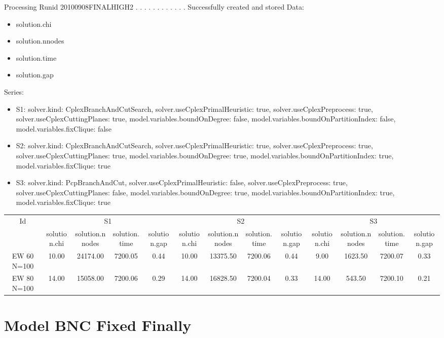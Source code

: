 \documentclass[landscape, 12pt]{report}
\begin{document}
 
Processing Runid 20100908FINALHIGH2
. . . . . . . . . . . .  Successfully created and stored
Data:
\begin{itemize}
\item solution.chi
\item solution.nnodes
\item solution.time
\item solution.gap
\end{itemize}
Series:
\begin{itemize}
\item S1: solver.kind: CplexBranchAndCutSearch, solver.useCplexPrimalHeuristic: true, solver.useCplexPreprocess: true, solver.useCplexCuttingPlanes: true, model.variables.boundOnDegree: false, model.variables.boundOnPartitionIndex: false, model.variables.fixClique: false
\item S2: solver.kind: CplexBranchAndCutSearch, solver.useCplexPrimalHeuristic: true, solver.useCplexPreprocess: true, solver.useCplexCuttingPlanes: true, model.variables.boundOnDegree: true, model.variables.boundOnPartitionIndex: true, model.variables.fixClique: true
\item S3: solver.kind: PcpBranchAndCut, solver.useCplexPrimalHeuristic: false, solver.useCplexPreprocess: true, solver.useCplexCuttingPlanes: false, model.variables.boundOnDegree: true, model.variables.boundOnPartitionIndex: true, model.variables.fixClique: true
\end{itemize}
\begin{tabular}{|c|cccc|cccc|cccc|}
\hline
\multicolumn{1}{|c|}{Id} & \multicolumn{4}{|c|}{S1} & \multicolumn{4}{|c|}{S2} & \multicolumn{4}{|c|}{S3}
\\
 & solution.chi & solution.nnodes & solution.time & solution.gap & solution.chi & solution.nnodes & solution.time & solution.gap & solution.chi & solution.nnodes & solution.time & solution.gap
\\
\hline
EW 60 N=100 & 10.00 & 24174.00 & 7200.05 & 0.44 & 10.00 & 13375.50 & 7200.06 & 0.44 & 9.00 & 1623.50 & 7200.07 & 0.33
\\
EW 80 N=100 & 14.00 & 15058.00 & 7200.06 & 0.29 & 14.00 & 16828.50 & 7200.04 & 0.33 & 14.00 & 543.50 & 7200.10 & 0.21
\\
\hline 
 \end{tabular}

	
		\clearpage
	
	\section{Model BNC Fixed Finally}
	
\end{document}
